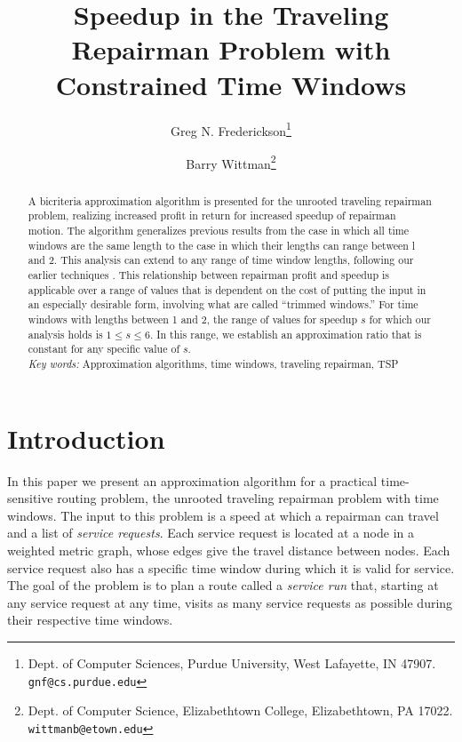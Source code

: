 \documentclass[11pt]{article}
\begin{document}
\title{Speedup in the Traveling Repairman Problem with Constrained Time Windows}
\author{Greg N. Frederickson\thanks{Dept. of Computer Sciences, Purdue University, West Lafayette,
    IN 47907. {\tt gnf@cs.purdue.edu}} \and Barry Wittman\thanks{Dept. of Computer Science, Elizabethtown College, Elizabethtown,
    PA 17022. {\tt wittmanb@etown.edu}}
}

\maketitle




\begin{abstract}
A bicriteria approximation algorithm is presented for the unrooted traveling repairman problem, realizing increased profit in return for increased speedup of repairman motion.  The algorithm generalizes previous results from the case in which all time windows are the same length to the case in which their lengths can range between l and 2.  This analysis can extend to any range of time window lengths, following our earlier techniques \cite{Frederickson6}.
This relationship between repairman profit and speedup is applicable over a range of values that is dependent on the cost of putting the input in an especially desirable form, involving what are called ``trimmed windows.''  For time windows with lengths between 1 and 2, the range of values for speedup $s$ for which our analysis holds is $1 \leq s \leq 6$.  In this range, we establish an approximation ratio that is constant for any specific value of $s$.\\

\noindent\emph{Key words:} Approximation algorithms, time windows, traveling repairman, TSP
\end{abstract}

\section{Introduction}

In this paper we present an approximation algorithm for a practical time-sensitive routing problem, the unrooted traveling repairman problem with time windows.  The input to this problem is a speed at which a repairman can travel and a list of {\em service requests}.  Each service request is located at a node in a weighted metric graph, whose edges give the travel distance between nodes.  Each service request also has a specific time window during which it is valid for service.  The goal of the problem is to plan a route called a {\em service run} that, starting at any service request at any time, visits as many service requests as possible during their respective time windows.
\end{document}
